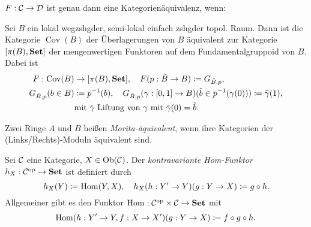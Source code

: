 \documentclass{cheat-sheet}
\DeclareMathOperator{\Cov}{Cov} %
\begin{document}

\begin{prop}
  $F : \mathcal{C} \to \mathcal{D}$ ist genau dann eine Kategorienäquivalenz, wenn:
   \quad
\end{prop}


\begin{bsp}
  Sei $B$ ein lokal wegzshgder, semi-lokal einfach zshgder topol. Raum. Dann ist die Kategorie $\Cov(B)$ der Überlagerungen von $B$ äquivalent zur Kategorie $[\pi(B), \mathbf{Set}]$ der mengenwertigen Funktoren auf dem Fundamentalgruppoid von $B$. Dabei ist
  \begin{align*}
    F : \Cov(B) & \to [\pi(B), \SetC], \quad F(p : \tilde{B} \to B) \coloneqq G_{\tilde{B},p}, \\
    G_{\tilde{B},p}(b \in B) & \coloneqq p^{-1}(b), \quad G_{\tilde{B},p}(\gamma : \I \to B)(\tilde{b} \in p^{-1}(\gamma(0))) \coloneqq \tilde{\gamma}(1), \\
    & \text{mit $\tilde{\gamma}$ Liftung von $\gamma$ mit $\tilde{\gamma}(0) = \tilde{b}$}.
  \end{align*}
\end{bsp}



\begin{defn}
  Zwei Ringe $A$ und $B$ heißen \emph{Morita-äquivalent}, wenn ihre Kategorien der (Links/Rechts)-Moduln äquivalent sind.
\end{defn}


\begin{defn}
  Sei $\mathcal{C}$ eine Kategorie, $X \in \operatorname{Ob}(\mathcal{C})$. Der \emph{kontravariante Hom-Funktor} $h_X : \mathcal{C}^{\mathrm{op}} \to \mathbf{Set}$ ist definiert durch
  \[
    h_X(Y) \coloneqq \operatorname{Hom}(Y, X), \quad
    h_X(h : Y' \to Y)(g : Y \to X) \coloneqq g \circ h.
  \]
  Allgemeiner gibt es den Funktor $\operatorname{Hom} : \mathcal{C}^{\mathrm{op}} \times \mathcal{C} \to \mathbf{Set}$ mit
  \[
    \operatorname{Hom}(h : Y' \to Y, f : X \to X')(g : Y \to X) \coloneqq f \circ g \circ h.
  \]
\end{defn}
\end{document}
